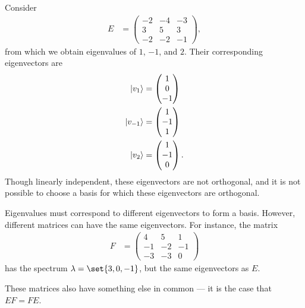 \documentclass[10pt]{mypackage}
\begin{document}
\begin{example}
\end{example}
\begin{example}
Consider
\begin{align*}
  E &= \begin{pmatrix}-2 & -4 & -3 \\ 3 & 5 & 3 \\ -2 & -2 & -1\end{pmatrix},
\end{align*}
from which we obtain eigenvalues of $1$, $-1$, and $2$. Their corresponding eigenvectors are
\begin{align*}
  \ket{v_1} &= \begin{pmatrix}1\\0\\-1\end{pmatrix}\\
  \ket{v_{-1}} &= \begin{pmatrix}1\\-1\\1\end{pmatrix}\\
  \ket{v_{2}} &= \begin{pmatrix}1\\-1\\0\end{pmatrix}.
\end{align*}
Though linearly independent, these eigenvectors are not orthogonal, and it is not possible to choose a basis for which these eigenvectors are orthogonal.
\end{example}
\begin{example}
  Eigenvalues must correspond to different eigenvectors to form a basis. However, different matrices can have the same eigenvectors. For instance, the matrix
  \begin{align*}
    F &= \begin{pmatrix}4 & 5 & 1 \\ -1 & -2 & -1 \\ -3 & -3 & 0\end{pmatrix}
  \end{align*}
  has the spectrum $\lambda = \set{3,0,-1}$, but the same eigenvectors as $E$.\newline

  These matrices also have something else in common --- it is the case that $EF = FE$.
\end{example}
\end{document}

